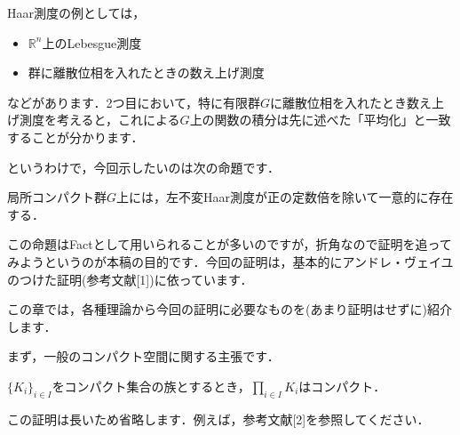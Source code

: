 Haar測度の例としては，
\begin{itemize}
 \item $\mathbb{R}^n$上のLebesgue測度
 \item 群に離散位相を入れたときの数え上げ測度
\end{itemize}
などがあります．2つ目において，特に有限群$G$に離散位相を入れたとき数え上げ測度を考えると，これによる$G$上の関数の積分は先に述べた「平均化」と一致することが分かります．

というわけで，今回示したいのは次の命題です．

\begin{prop}[Haar測度の存在と一意性]\label{2}
局所コンパクト群$G$上には，左不変Haar測度が正の定数倍を除いて一意的に存在する．
\end{prop}
この命題はFactとして用いられることが多いのですが，折角なので証明を追ってみようというのが本稿の目的です．今回の証明は，基本的にアンドレ・ヴェイユのつけた証明(参考文献[1])に依っています．

この章では，各種理論から今回の証明に必要なものを(あまり証明はせずに)紹介します．

まず，一般のコンパクト空間に関する主張です．

\begin{thm}[Tychonoffの定理]\label{3}
$\{ K_i \} _{i \in I}$をコンパクト集合の族とするとき，$\prod_{i \in I} K_i$はコンパクト．
\end{thm}
この証明は長いため省略します．例えば，参考文献[2]を参照してください．

